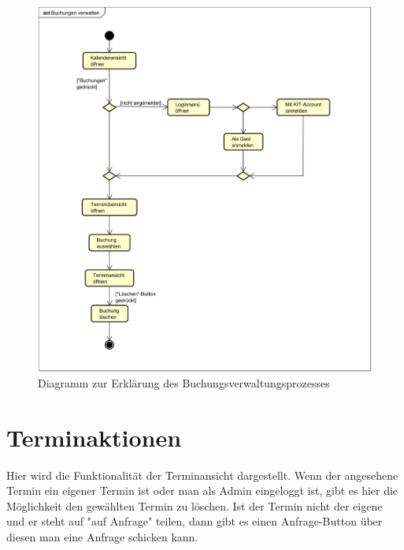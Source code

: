 \begin{figure}[ht]
    \centering
    \includegraphics[width=\textwidth]{figures/activity/buchungverwalten}
    \caption{Diagramm zur Erklärung des Buchungsverwaltungsprozesses}
    \label{fig:manage-booking-diagram}
\end{figure}
\clearpage

\section{Terminaktionen}

Hier wird die Funktionalität der Terminansicht dargestellt. Wenn der angesehene Termin ein eigener Termin ist
oder man als Admin eingeloggt ist, gibt es hier die Möglichkeit den gewählten Termin zu löschen. Ist der
Termin nicht der eigene und er steht auf "auf Anfrage" teilen, dann gibt es einen Anfrage-Button über diesen man
eine Anfrage schicken kann.

